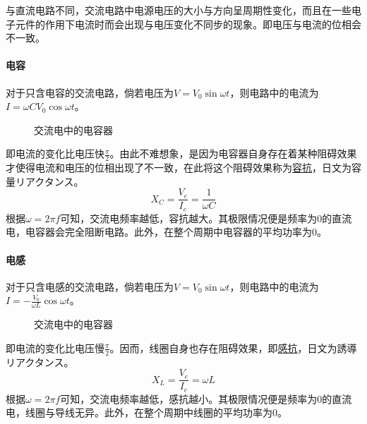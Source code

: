 与直流电路不同，交流电路中电源电压的大小与方向呈周期性变化，而且在一些电子元件的作用下电流时而会出现与电压变化不同步的现象。即电压与电流的位相会不一致。

\paragraph{电容} 对于只含电容的交流电路，倘若电压为$V=V_0\sin\omega t$，则电路中的电流为$I=\omega CV_0\cos\omega t$。
\begin{figure}[ht!]
    \centering
    \caption{交流电中的电容器}
\end{figure}
即电流的变化比电压快$\frac\pi2$。由此不难想象，是因为电容器自身存在着某种阻碍效果才使得电流和电压的位相出现了不一致，在此将这个阻碍效果称为\underline{容抗}，日文为容量リアクタンス。
\begin{equation*}
    X_C=\frac{V_e}{I_e}=\frac{1}{\omega C}
\end{equation*}
根据$\omega=2\pi f$可知，交流电频率越低，容抗越大。其极限情况便是频率为0的直流电，电容器会完全阻断电路。此外，在整个周期中电容器的平均功率为0。

\paragraph{电感} 对于只含电感的交流电路，倘若电压为$V=V_0\sin\omega t$，则电路中的电流为$I=-\frac{V_0}{\omega L}\cos\omega t$。
\begin{figure}[ht!]
    \centering
    \caption{交流电中的电容器}
\end{figure}
即电流的变化比电压慢$\frac\pi2$。因而，线圈自身也存在阻碍效果，即\underline{感抗}，日文为誘導リアクタンス。
\begin{equation*}
    X_L=\frac{V_e}{I_e}=\omega L
\end{equation*}
根据$\omega=2\pi f$可知，交流电频率越低，感抗越小。其极限情况便是频率为0的直流电，线圈与导线无异。此外，在整个周期中线圈的平均功率为0。

